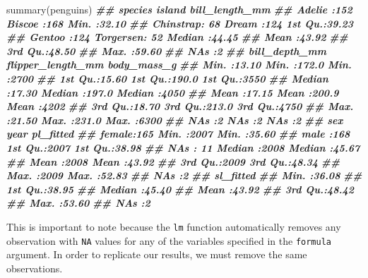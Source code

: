\documentclass[
]{book}
\newenvironment{Shaded}{\begin{snugshade}}{\end{snugshade}}
\newcommand{\DocumentationTok}[1]{\textcolor[rgb]{0.56,0.35,0.01}{\textbf{\textit{#1}}}}
\newcommand{\FunctionTok}[1]{\textcolor[rgb]{0.00,0.00,0.00}{#1}}
\newcommand{\NormalTok}[1]{#1}
\theoremstyle{definition}
\theoremstyle{definition}
\theoremstyle{definition}
\theoremstyle{definition}
\theoremstyle{remark}
\begin{document}
\begin{Shaded}
\begin{Highlighting}[]
\FunctionTok{summary}\NormalTok{(penguins)}
\DocumentationTok{\#\#       species          island    bill\_length\_mm }
\DocumentationTok{\#\#  Adelie   :152   Biscoe   :168   Min.   :32.10  }
\DocumentationTok{\#\#  Chinstrap: 68   Dream    :124   1st Qu.:39.23  }
\DocumentationTok{\#\#  Gentoo   :124   Torgersen: 52   Median :44.45  }
\DocumentationTok{\#\#                                  Mean   :43.92  }
\DocumentationTok{\#\#                                  3rd Qu.:48.50  }
\DocumentationTok{\#\#                                  Max.   :59.60  }
\DocumentationTok{\#\#                                  NA\textquotesingle{}s   :2      }
\DocumentationTok{\#\#  bill\_depth\_mm   flipper\_length\_mm  body\_mass\_g  }
\DocumentationTok{\#\#  Min.   :13.10   Min.   :172.0     Min.   :2700  }
\DocumentationTok{\#\#  1st Qu.:15.60   1st Qu.:190.0     1st Qu.:3550  }
\DocumentationTok{\#\#  Median :17.30   Median :197.0     Median :4050  }
\DocumentationTok{\#\#  Mean   :17.15   Mean   :200.9     Mean   :4202  }
\DocumentationTok{\#\#  3rd Qu.:18.70   3rd Qu.:213.0     3rd Qu.:4750  }
\DocumentationTok{\#\#  Max.   :21.50   Max.   :231.0     Max.   :6300  }
\DocumentationTok{\#\#  NA\textquotesingle{}s   :2       NA\textquotesingle{}s   :2         NA\textquotesingle{}s   :2     }
\DocumentationTok{\#\#      sex           year        pl\_fitted    }
\DocumentationTok{\#\#  female:165   Min.   :2007   Min.   :35.60  }
\DocumentationTok{\#\#  male  :168   1st Qu.:2007   1st Qu.:38.98  }
\DocumentationTok{\#\#  NA\textquotesingle{}s  : 11   Median :2008   Median :45.67  }
\DocumentationTok{\#\#               Mean   :2008   Mean   :43.92  }
\DocumentationTok{\#\#               3rd Qu.:2009   3rd Qu.:48.34  }
\DocumentationTok{\#\#               Max.   :2009   Max.   :52.83  }
\DocumentationTok{\#\#                              NA\textquotesingle{}s   :2      }
\DocumentationTok{\#\#    sl\_fitted    }
\DocumentationTok{\#\#  Min.   :36.08  }
\DocumentationTok{\#\#  1st Qu.:38.95  }
\DocumentationTok{\#\#  Median :45.40  }
\DocumentationTok{\#\#  Mean   :43.92  }
\DocumentationTok{\#\#  3rd Qu.:48.42  }
\DocumentationTok{\#\#  Max.   :53.60  }
\DocumentationTok{\#\#  NA\textquotesingle{}s   :2}
\end{Highlighting}
\end{Shaded}

This is important to note because the \texttt{lm} function automatically removes any observation with \texttt{NA} values for any of the variables specified in the \texttt{formula} argument. In order to replicate our results, we must remove the same observations.
\end{document}
